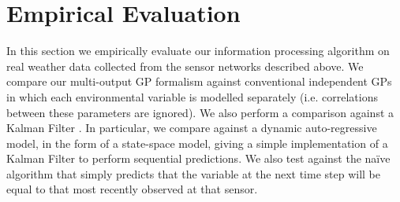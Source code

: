 \documentclass{acmtrans2m}
\begin{document}
% 
% 


\section{Empirical Evaluation}\label{sec_evaluation}

\noindent In this section we empirically evaluate our information processing algorithm on real weather data collected from the sensor networks described above. We compare our multi-output GP formalism against conventional independent GPs in which each environmental variable is modelled separately (i.e. correlations between these parameters are ignored). We also perform a comparison against a Kalman Filter \cite{Jazwinski,MinTechReport}. In particular, we compare against a
dynamic auto-regressive model, in the form of a state-space model, giving a simple implementation of a Kalman Filter to perform sequential predictions. We also test against the na\"{i}ve algorithm that simply predicts that the variable at the next time step will be equal to that most recently observed at that sensor.
\end{document}
